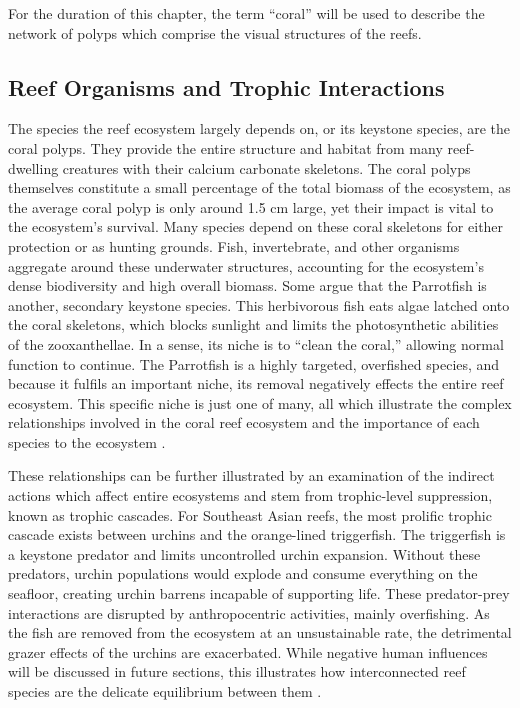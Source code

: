 \documentclass{book}\usepackage{knitr}
\begin{document}
For the duration of this chapter, the term ``coral'' will be used to describe the network of polyps which comprise the visual structures of the reefs. 

\subsection{Reef Organisms and Trophic Interactions}

The species the reef ecosystem largely depends on, or its keystone species, are the coral polyps. They provide the entire structure and habitat from many reef-dwelling creatures with their calcium carbonate skeletons. The coral polyps themselves constitute a small percentage of the total biomass of the ecosystem, as the average coral polyp is only around 1.5 cm large, yet their impact is vital to the ecosystem's survival. Many species depend on these coral skeletons for either protection or as hunting grounds. Fish, invertebrate, and other organisms aggregate around these underwater structures, accounting for the ecosystem’s dense biodiversity and high overall biomass. Some argue that the Parrotfish is another, secondary keystone species. This herbivorous fish eats algae latched onto the coral skeletons, which blocks sunlight and limits the photosynthetic abilities of the zooxanthellae. In a sense, its niche is to ``clean the coral,'' allowing normal function to continue. The Parrotfish is a highly targeted, overfished species, and because it fulfils an important niche, its removal negatively effects the entire reef ecosystem. This specific niche is just one of many, all which illustrate the complex relationships involved in the coral reef ecosystem and the importance of each species to the ecosystem \citep{https://doi.org/10.1890/15-1492.1}. 

These relationships can be further illustrated by an examination of the indirect actions which affect entire ecosystems and stem from trophic-level suppression, known as trophic cascades. For Southeast Asian reefs, the most prolific trophic cascade exists between urchins and the orange-lined triggerfish. The triggerfish is a keystone predator and limits uncontrolled urchin expansion. Without these predators, urchin populations would explode and consume everything on the seafloor, creating urchin barrens incapable of supporting life. These predator-prey interactions are disrupted by anthropocentric activities, mainly overfishing. As the fish are removed from the ecosystem at an unsustainable rate, the detrimental grazer effects of the urchins are exacerbated. While negative human influences will be discussed in future sections, this illustrates how interconnected reef species are the delicate equilibrium between them \citep{https://doi.org/10.1890/15-1492.1}.
\end{document}
